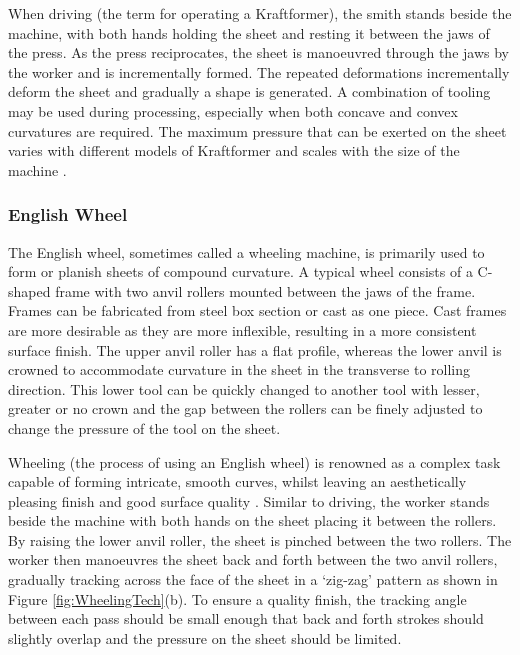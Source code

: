When driving (the term for operating a Kraftformer), the smith stands beside the machine, with both hands holding the sheet and resting it between the jaws of the press. As the press reciprocates, the sheet is manoeuvred through the jaws by the worker and is incrementally formed. The repeated deformations incrementally deform the sheet and gradually a shape is generated. A combination of tooling may be used during processing, especially when both concave and convex curvatures are required. The maximum pressure that can be exerted on the sheet varies with different models of Kraftformer and scales with the size of the machine \citep{Unknown2020ECKOLDBrochure}.

\subsubsection{English Wheel} \label{sec:ManualEW}

The English wheel, sometimes called a wheeling machine, is primarily used to form or planish sheets of compound curvature. A typical wheel consists of a C-shaped frame with two anvil rollers mounted between the jaws of the frame. Frames can be fabricated from steel box section or cast as one piece. Cast frames are more desirable as they are more inflexible, resulting in a more consistent surface finish. The upper anvil roller has a flat profile, whereas the lower anvil is crowned to accommodate curvature in the sheet in the transverse to rolling direction. This lower tool can be quickly changed to another tool with lesser, greater or no crown and the gap between the rollers can be finely adjusted to change the pressure of the tool on the sheet. 

Wheeling (the process of using an English wheel) is renowned as a complex task capable of forming intricate, smooth curves, whilst leaving an aesthetically pleasing finish and good surface quality \citep{Longyard2014LearningWheel}. Similar to driving, the worker stands beside the machine with both hands on the sheet placing it between the rollers. By raising the lower anvil roller, the sheet is pinched between the two rollers. The worker then manoeuvres the sheet back and forth between the two anvil rollers, gradually tracking across the face of the sheet in a `zig-zag' pattern as shown in Figure \ref{fig:WheelingTech}(b). To ensure a quality finish, the tracking angle between each pass should be small enough that back and forth strokes should slightly overlap and the pressure on the sheet should be limited.  


